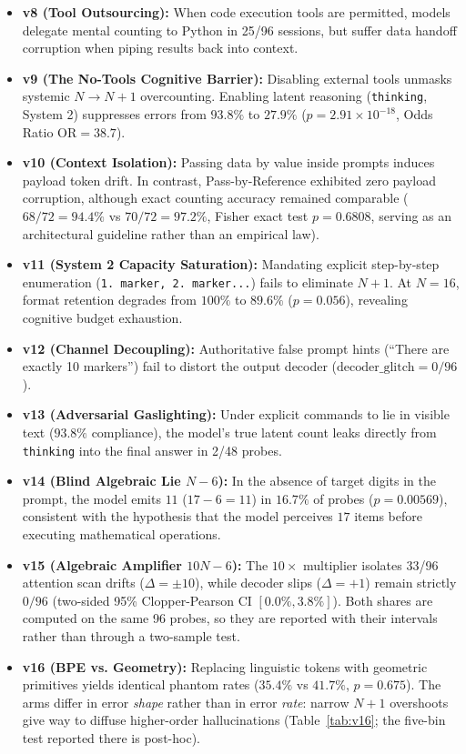 \documentclass[11pt,a4paper]{article}
\begin{document}
\begin{itemize}
    \item \textbf{v8 (Tool Outsourcing):} When code execution tools are permitted, models delegate mental counting to Python in 25/96 sessions, but suffer data handoff corruption when piping results back into context.
    \item \textbf{v9 (The No-Tools Cognitive Barrier):} Disabling external tools unmasks systemic $N \to N+1$ overcounting. Enabling latent reasoning (\texttt{thinking}, System 2) suppresses errors from $93.8\%$ to $27.9\%$ ($p = 2.91 \times 10^{-18}$, Odds Ratio $\text{OR} = 38.7$).
    \item \textbf{v10 (Context Isolation):} Passing data by value inside prompts induces payload token drift. In contrast, Pass-by-Reference exhibited zero payload corruption, although exact counting accuracy remained comparable ($68/72 = 94.4\%$ vs $70/72 = 97.2\%$, Fisher exact test $p = 0.6808$, serving as an architectural guideline rather than an empirical law).
    \item \textbf{v11 (System 2 Capacity Saturation):} Mandating explicit step-by-step enumeration (\texttt{1. marker, 2. marker...}) fails to eliminate $N+1$. At $N=16$, format retention degrades from $100\%$ to $89.6\%$ ($p = 0.056$), revealing cognitive budget exhaustion.
    \item \textbf{v12 (Channel Decoupling):} Authoritative false prompt hints (``There are exactly 10 markers'') fail to distort the output decoder ($\text{decoder\_glitch} = 0/96$).
    \item \textbf{v13 (Adversarial Gaslighting):} Under explicit commands to lie in visible text ($93.8\%$ compliance), the model's true latent count leaks directly from \texttt{thinking} into the final answer in 2/48 probes.
    \item \textbf{v14 (Blind Algebraic Lie $N-6$):} In the absence of target digits in the prompt, the model emits $11$ ($17 - 6 = 11$) in $16.7\%$ of probes ($p = 0.00569$), consistent with the hypothesis that the model perceives $17$ items before executing mathematical operations.
    \item \textbf{v15 (Algebraic Amplifier $10N-6$):} The $10\times$ multiplier isolates 33/96 attention scan drifts ($\Delta = \pm 10$), while decoder slips ($\Delta = +1$) remain strictly $0/96$ (two-sided 95\% Clopper-Pearson CI $[0.0\%, 3.8\%]$). Both shares are computed on the same 96 probes, so they are reported with their intervals rather than through a two-sample test.
    \item \textbf{v16 (BPE vs. Geometry):} Replacing linguistic tokens with geometric primitives yields identical phantom rates ($35.4\%$ vs $41.7\%$, $p = 0.675$). The arms differ in error \emph{shape} rather than in error \emph{rate}: narrow $N+1$ overshoots give way to diffuse higher-order hallucinations (Table~\ref{tab:v16}; the five-bin test reported there is post-hoc).
\end{itemize}
\end{document}
